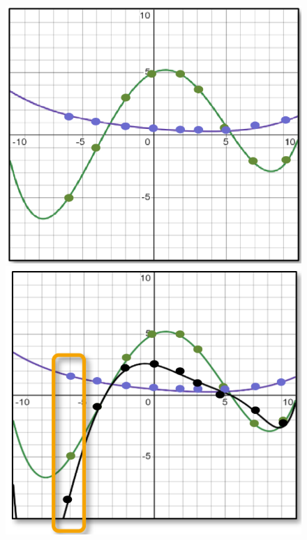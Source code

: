 \documentclass[
../../AuD-Zusammenfassung.tex,
]
{subfiles}
\begin{document}
\begin{figure}[htp]
    \centering
    \includegraphics[scale = 0.49]{Pics/PolyMultGraph1.png}
    \includegraphics[scale = 0.5]{Pics/PolyMultGraph2.png}
\end{figure}
\end{document}
